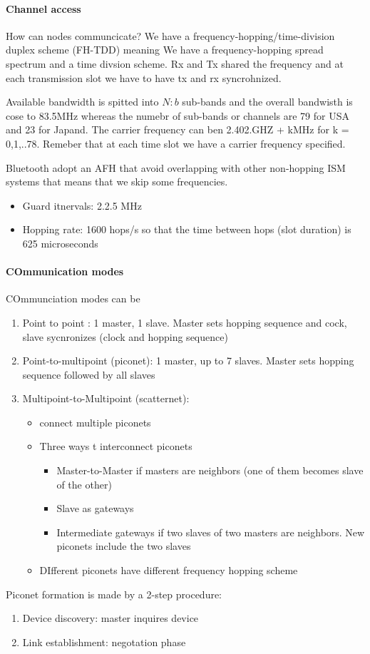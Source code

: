 \paragraph{Channel access}
How can nodes communcicate? We have a frequency-hopping/time-division duplex scheme (FH-TDD) meaning We have a frequency-hopping spread spectrum and a time divsion scheme. Rx and Tx shared the frequency and at each transmission slot we have to have tx and rx syncrohnized.

Available bandwidth is spitted into $N:b$ sub-bands and the overall bandwisth is cose to 83.5MHz whereas the numebr of sub-bands or channels are 79 for USA and 23 for Japand. 
The carrier frequency can ben 2.402.GHZ + kMHz for k = 0,1,..78. Remeber that at each time slot we have a carrier frequency specified.

Bluetooth adopt an AFH that avoid overlapping with other non-hopping ISM systems that means that we skip some frequencies. 
\begin{itemize}
\item Guard itnervals: 2.2.5 MHz
\item Hopping rate: 1600 hops/s so that the time between hops (slot duration) is 625 microseconds
\end{itemize}

\paragraph{COmmunication modes}
COmmunciation modes can be 
\begin{enumerate}
\item Point to point
: 1 master, 1 slave. Master sets hopping sequence and cock, slave sycnronizes (clock and hopping sequence)
\item Point-to-multipoint (piconet): 1 master, up to 7 slaves. Master sets hopping sequence followed by all slaves
\item Multipoint-to-Multipoint (scatternet):
\begin{itemize}
\item connect multiple piconets
\item Three ways t interconnect piconets 
\begin{itemize}
\item Master-to-Master if masters are neighbors (one of them becomes slave of the other)
\item Slave as gateways
\item Intermediate gateways if two slaves of two masters are neighbors. New piconets include the two slaves 
\end{itemize}
\item DIfferent piconets have different frequency hopping scheme
\end{itemize}
\end{enumerate}
Piconet formation is made by a 2-step procedure:
\begin{enumerate}
\item Device discovery: master inquires device
\item Link establishment: negotation phase
\end{enumerate}

